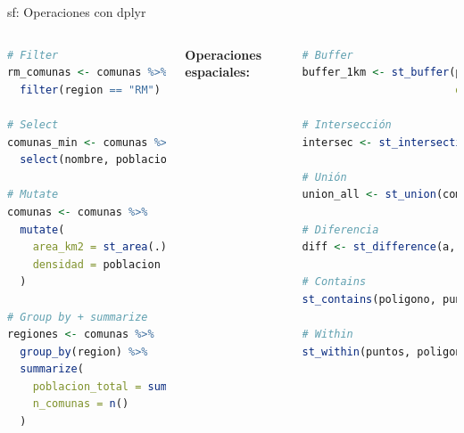 \documentclass[10pt,aspectratio=169]{beamer}
\begin{document}
\begin{frame}[fragile]{sf: Operaciones con dplyr}
    \begin{columns}[T]
        \begin{lstlisting}[language=R]
# Filter
rm_comunas <- comunas %>%
  filter(region == "RM")

# Select
comunas_min <- comunas %>%
  select(nombre, poblacion, geometry)

# Mutate
comunas <- comunas %>%
  mutate(
    area_km2 = st_area(.) / 1e6,
    densidad = poblacion / area_km2
  )

# Group by + summarize
regiones <- comunas %>%
  group_by(region) %>%
  summarize(
    poblacion_total = sum(poblacion),
    n_comunas = n()
  )
        \end{lstlisting}
        
        \textbf{Operaciones espaciales:}
        \begin{lstlisting}[language=R]
# Buffer
buffer_1km <- st_buffer(puntos_sf, 
                        dist = 1000)

# Intersección
intersec <- st_intersection(a, b)

# Unión
union_all <- st_union(comunas)

# Diferencia
diff <- st_difference(a, b)

# Contains
st_contains(poligono, puntos)

# Within
st_within(puntos, poligono)
        \end{lstlisting}
    \end{columns}
\end{frame}
\end{document}
